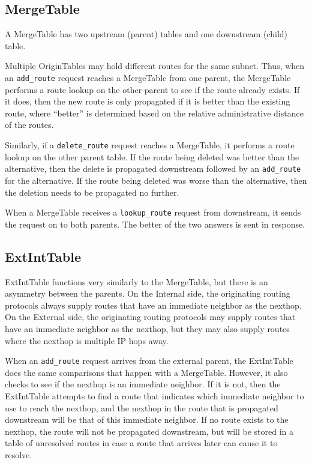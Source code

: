 \documentclass[11pt]{article}
\begin{document}
\subsection{MergeTable}

A MergeTable has two upstream (parent) tables and one downstream
(child) table.

Multiple OriginTables may hold different routes for the same subnet.
Thus, when an {\tt add\_route} request reaches a MergeTable from one
parent, the MergeTable performs a route lookup on the other parent to
see if the route already exists.  If it does, then the new route is
only propagated if it is better than the existing route, where
``better'' is determined based on the relative administrative distance
of the routes.

Similarly, if a {\tt delete\_route} request reaches a MergeTable, it
performs a route lookup on the other parent table.  If the route being
deleted was better than the alternative, then the delete is propagated
downstream followed by an {\tt add\_route} for the alternative.  If the
route being deleted was worse than the alternative, then the deletion
needs to be propagated no further.

When a MergeTable receives a {\tt lookup\_route} request from
downstream, it sends the request on to both parents.  The better of
the two answers is sent in response.

\subsection{ExtIntTable}

ExtIntTable functions very similarly to the MergeTable, but there is
an asymmetry between the parents.  On the Internal side, the
originating routing protocols always supply routes that have an
immediate neighbor as the nexthop.  On the External side, the
originating routing protocols may supply routes that have an immediate
neighbor as the nexthop, but they may also supply routes where the
nexthop is multiple IP hops away.  

When an {\tt add\_route} request arrives from the external parent, the
ExtIntTable does the same comparisons that happen with a MergeTable.
However, it also checks to see if the nexthop is an immediate
neighbor.  If it is not, then the ExtIntTable attempts to find a route
that indicates which immediate neighbor to use to reach the nexthop,
and the nexthop in the route that is propagated downstream will be
that of this immediate neighbor.  If no route exists to the nexthop,
the route will not be propagated downstream, but will be stored in a
table of unresolved routes in case a route that arrives later can
cause it to resolve.
\end{document}
